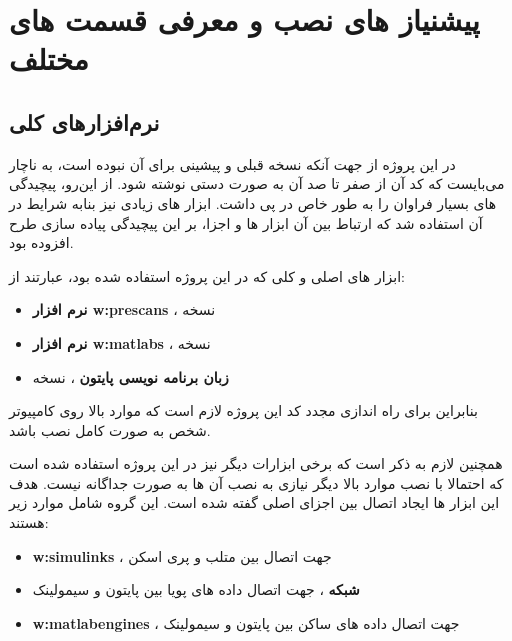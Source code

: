 









\section{پیشنیاز های نصب و معرفی قسمت های مختلف}\label{ch:req}

\subsection{نرم‌افزار‌های کلی}
در این پروژه از جهت آنکه نسخه قبلی و پیشینی برای  آن نبوده است، به ناچار می‌بایست که کد آن از صفر تا صد آن به صورت دستی نوشته شود. از این‌رو، پیچیدگی های بسیار فراوان را به طور خاص در پی داشت. ابزار های زیادی نیز بنابه شرایط در آن استفاده شد که ارتباط بین آن ابزار ها و اجزا، بر این پیچیدگی پیاده سازی طرح افزوده بود.

ابزار های اصلی و کلی که در این پروژه استفاده شده بود، عبارتند از:

\begin{itemize}
	\item 
	\textbf{نرم افزار 
		\glspl{w:prescan}}
	، نسخه 
	
	\item 
	\textbf{نرم افزار 
		\glspl{w:matlab}	
	}
	، نسخه 
	\item 
	\textbf{زبان برنامه نویسی پایتون}
	، نسخه 
\end{itemize}

بنابراین برای راه اندازی مجدد کد این پروژه لازم است که موارد بالا روی کامپیوتر شخص به صورت کامل نصب باشد.

همچنین لازم به ذکر است که برخی ابزارات دیگر نیز در این پروژه استفاده شده است که احتمالا با نصب موارد بالا دیگر نیازی به نصب آن ها به صورت جداگانه نیست. هدف این ابزار ها ایجاد اتصال بین اجزای اصلی گفته شده است. این گروه شامل موارد زیر هستند:

\begin{itemize}
	\item 
	\textbf{\glspl{w:simulink}}
	، جهت اتصال بین متلب و پری اسکن
	
	\item 
	\textbf{شبکه }
	، جهت اتصال داده های پویا 
	بین پایتون و سیمولینک
	
	\item \textbf{\glspl{w:matlabengine}}
	، جهت اتصال داده های ساکن
	بین پایتون و سیمولینک
\end{itemize}


